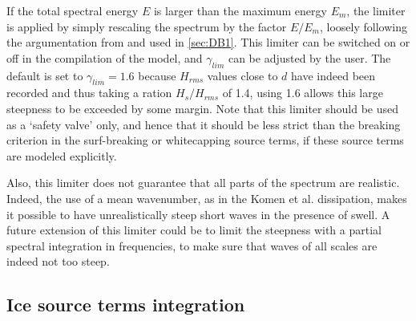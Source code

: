 If the total spectral energy $E$ is larger than the maximum energy $E_m$, the
limiter is applied by simply rescaling the spectrum by the factor $E/E_m$,
loosely following the argumentation from \cite{art:EB96} and used
in \para\ref{sec:DB1}.  This limiter can be switched on or off in the
compilation of the model, and $\gamma_{lim}$ can be adjusted by the user. The
default is set to $\gamma_{lim} = 1.6$ because $H_{rms}$ values close to $d$
have indeed been recorded and thus taking a ration $H_s/H_{rms}$ of 1.4, using
1.6 allows this large steepness to be exceeded by some margin.  Note that this
limiter should be used as a `safety valve' only, and hence that it should be
less strict than the breaking criterion in the surf-breaking or whitecapping
source terms, if these source terms are modeled explicitly.

Also, this limiter does not guarantee that all parts of the spectrum are
realistic. Indeed, the use of a mean wavenumber, as in the Komen et
al. dissipation, makes it possible to have unrealistically steep short waves
in the presence of swell. A future extension of this limiter could be to limit
the steepness with a partial spectral integration in frequencies, to make sure
that waves of all scales are indeed not too steep.

\vssub
\subsection{Ice source terms integration} \label{sub:source}
\vssub

